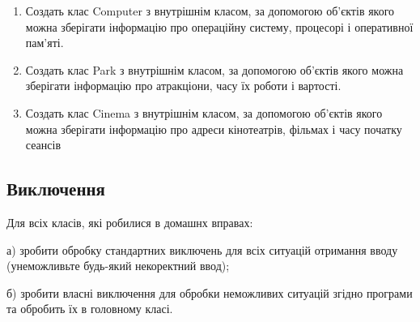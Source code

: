 \documentclass[]{article}
\begin{document}
\begin{enumerate}
\item  Создать клас Computer з внутрішнім класом, за допомогою об'єктів якого можна зберігати інформацію про операційну систему, процесорі і оперативної пам'яті.
\item  Создать клас Park з внутрішнім класом, за допомогою об'єктів якого можна зберігати інформацію про атракціони, часу їх роботи і вартості.
\item  Создать клас Cinema з внутрішнім класом, за допомогою об'єктів якого можна зберігати інформацію про адреси кінотеатрів, фільмах і часу початку сеансів
\end{enumerate}

\subsection{Виключення}

Для всіх класів, які робилися в домашнх  вправах:

а) зробити обробку стандартних виключень для всіх ситуацій отримання вводу
(унеможливьте будь-який некоректний ввод); 

б) зробити власні виключення для обробки неможливих ситуацій згідно програми та обробить їх в головному класі.
\end{document}
